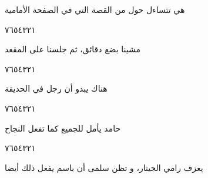 \documentclass[11pt, a4paper]{article}
\begin{document}
{\vspace{0.5\baselineskip}\begin{flushright}
\textarabic{هي تتساءل حول من القصة التي في الصفحة الأمامية}
\end{flushright}

\begin{center}
        \hfill\textarabic{٧}\hfill\textarabic{٦}\hfill\textarabic{٥}\hfill\textarabic{٤}\hfill\textarabic{٣}\hfill\textarabic{٢}\hfill\textarabic{١}
        \end{center}


\vspace{0.5\baselineskip}\begin{flushright}
\textarabic{مشينا بضع دقائق، ثم جلسنا على المقعد}
\end{flushright}

\begin{center}
        \hfill\textarabic{٧}\hfill\textarabic{٦}\hfill\textarabic{٥}\hfill\textarabic{٤}\hfill\textarabic{٣}\hfill\textarabic{٢}\hfill\textarabic{١}
        \end{center}


\vspace{0.5\baselineskip}\begin{flushright}
\textarabic{هناك يبدو أن رجل في الحديقة}
\end{flushright}

\begin{center}
        \hfill\textarabic{٧}\hfill\textarabic{٦}\hfill\textarabic{٥}\hfill\textarabic{٤}\hfill\textarabic{٣}\hfill\textarabic{٢}\hfill\textarabic{١}
        \end{center}


\vspace{0.5\baselineskip}\begin{flushright}
\textarabic{حامد يأمل للجميع كما تفعل النجاح}
\end{flushright}

\begin{center}
        \hfill\textarabic{٧}\hfill\textarabic{٦}\hfill\textarabic{٥}\hfill\textarabic{٤}\hfill\textarabic{٣}\hfill\textarabic{٢}\hfill\textarabic{١}
        \end{center}


\vspace{0.5\baselineskip}\begin{flushright}
\textarabic{يعزف رامي الجيتار، و تظن سلمى أن باسم يفعل ذلك أيضا}
\end{flushright}

}
\end{document}
